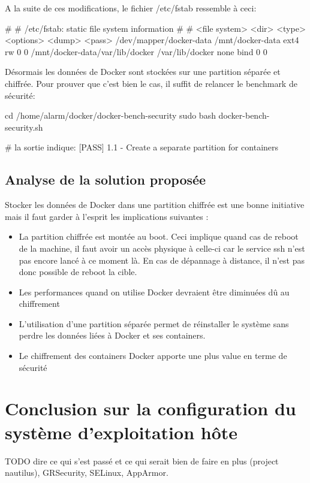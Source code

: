\documentclass[11pt,a4paper,oneside]{report}
\begin{document}
A la suite de ces modifications, le fichier /etc/fstab ressemble à ceci:
\begin{bashcode}
#
# /etc/fstab: static file system information
#
# <file system> <dir>   <type>  <options>       <dump>  <pass>
/dev/mapper/docker-data /mnt/docker-data ext4 rw 0 0
/mnt/docker-data/var/lib/docker /var/lib/docker none bind 0 0
\end{bashcode}


Désormais les données de Docker sont stockées sur une partition séparée et chiffrée. Pour prouver que c'est bien le cas, il suffit de relancer le benchmark de sécurité:

\begin{bashcode}
cd /home/alarm/docker/docker-bench-security
sudo bash docker-bench-security.sh

# la sortie indique:
[PASS] 1.1  - Create a separate partition for containers
\end{bashcode}


\subsection{Analyse de la solution proposée}
Stocker les données de Docker dans une partition chiffrée est une bonne initiative mais il faut garder à l'esprit les implications suivantes :
\begin{itemize}

\item La partition chiffrée est montée au boot. Ceci implique quand cas de reboot de la machine, il faut avoir un accès physique à celle-ci car le service ssh n'est pas encore lancé à ce moment là. En cas de dépannage à distance, il n'est pas donc possible de reboot la cible.
\item Les performances quand on utilise Docker devraient être diminuées dû au chiffrement
\item L'utilisation d'une partition séparée permet de réinstaller le système sans perdre les données liées à Docker et ses containers.
\item Le chiffrement des containers Docker apporte une plus value en terme de sécurité
\end{itemize}

\section{Conclusion sur la configuration du système d'exploitation hôte}
TODO dire ce qui s'est passé et ce qui serait bien de faire en plus (project nautilus), GRSecurity, SELinux, AppArmor.
\end{document}
